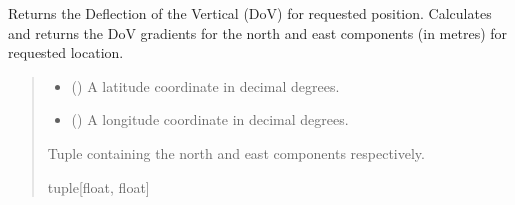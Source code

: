 \documentclass[letterpaper,10pt,english]{sphinxmanual}
\begin{document}
\begin{fulllineitems}
\begin{fulllineitems}
\label{\detokenize{modules/earth/geoid:qnav.earth.geoid.GeoidModel.get_dov}}
\pysigstartsignatures
{}
\pysigstopsignatures
\sphinxAtStartPar
Returns the Deflection of the Vertical (DoV) for requested position.
Calculates and returns the DoV gradients for the north and east
components (in metres) for requested location.
\begin{quote}\begin{description}
\begin{itemize}
\item {} 
\sphinxAtStartPar
{} () \textendash{} A latitude coordinate in decimal degrees.

\item {} 
\sphinxAtStartPar
{} () \textendash{} A longitude coordinate in decimal degrees.

\end{itemize}

\sphinxAtStartPar
Tuple containing the north and east components respectively.

\sphinxAtStartPar
tuple{[}float, float{]}

\end{description}\end{quote}

\end{fulllineitems}



\end{fulllineitems}
\end{document}
